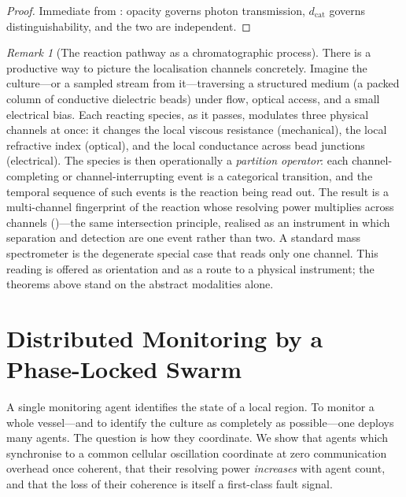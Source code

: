 \documentclass[11pt,twocolumn,a4paper]{article}
\theoremstyle{thmstyle}
\theoremstyle{definition}
\theoremstyle{remark}
\newtheorem{remark}[theorem]{Remark}
\newcommand{\dcat}{d_{\mathrm{cat}}}
\begin{document}
\begin{proof}
Immediate from : opacity governs photon transmission,
$\dcat$ governs distinguishability, and the two are independent.
\end{proof}

\begin{remark}[The reaction pathway as a chromatographic process]
\label{rem:chromatography}
There is a productive way to picture the localisation channels
concretely. Imagine the culture---or a sampled stream from it---traversing
a structured medium (a packed column of conductive dielectric beads) under
flow, optical access, and a small electrical bias. Each reacting species,
as it passes, modulates three physical channels at once: it changes the
local viscous resistance (mechanical), the local refractive index
(optical), and the local conductance across bead junctions (electrical).
The species is then operationally a \emph{partition operator}: each
channel-completing or channel-interrupting event is a categorical
transition, and the temporal sequence of such events is the reaction being
read out. The result is a multi-channel fingerprint of the reaction
whose resolving power multiplies across channels
()---the same intersection principle, realised as an
instrument in which separation and detection are one event rather than two.
A standard mass spectrometer is the degenerate special case that reads only
one channel. This reading is offered as orientation and as a route to a
physical instrument; the theorems above stand on the abstract modalities
alone.
\end{remark}

\section{Distributed Monitoring by a Phase-Locked Swarm}
\label{sec:swarm}

A single monitoring agent identifies the state of a local region. To
monitor a whole vessel---and to identify the culture as completely as
possible---one deploys many agents. The question is how they coordinate. We
show that agents which synchronise to a common cellular oscillation
coordinate at zero communication overhead once coherent, that their
resolving power \emph{increases} with agent count, and that the loss of
their coherence is itself a first-class fault signal.
\end{document}
